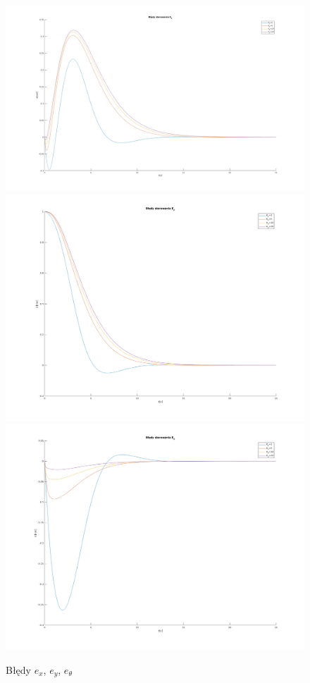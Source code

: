 \documentclass[12pt,a4paper]{article}
\begin{document}
  \begin{figure}[H]
    \centering
    \includegraphics[height=0.3\textheight]{figures/dyn_bledy_k2_ex.png}
    \includegraphics[height=0.3\textheight]{figures/dyn_bledy_k2_ey.png}
    \includegraphics[height=0.3\textheight]{figures/dyn_bledy_k2_eo.png}
    \caption{Błędy $e_x$, $e_y$, $e_\theta$}
    \label{fig:6}
  \end{figure}
\end{document}
